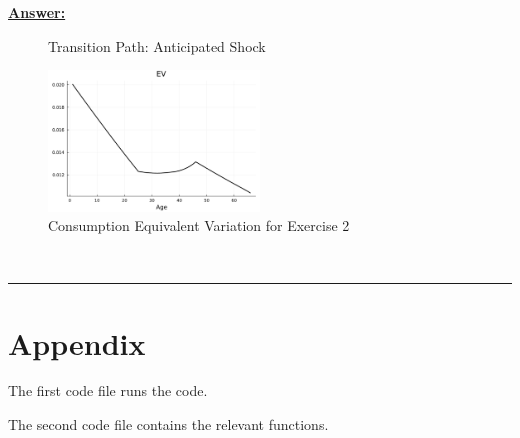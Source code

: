 \documentclass{article} %
\theoremstyle{definition}
\newenvironment{solution}[1][Answer]{\begin{singlespace}\underline{\textbf{#1:}}\quad }{\ \rule{0.3em}{0.3em}\end{singlespace}} %
\begin{document}
\begin{enumerate}
\begin{solution}
\begin{figure}
\begin{subfigure}[b]{0.475\textwidth}
      \end{subfigure}
      \caption{Transition Path: Anticipated Shock}
      \label{fig2}
    \end{figure}
    \clearpage
	\begin{figure}
	    \begin{center}
	      \includegraphics[width=0.5\textwidth]{Figures/EV_ex2.pdf}
		\caption{Consumption Equivalent Variation for Exercise 2}
		\label{EV2}
	    \end{center}
	\end{figure}
  \end{solution}
\end{enumerate}
\newpage
	\section*{Appendix}
 	The first code file runs the code.
	
 	The second code file contains the relevant functions.
\end{document}

